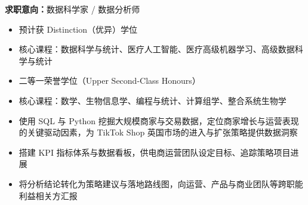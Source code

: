 \documentclass{zh_resume}
\begin{document}
\centerline{\small \textbf{求职意向：}数据科学家 / 数据分析师}



\begin{itemize}
  \item 预计获 Distinction（优异）学位
  \item 核心课程：数据科学与统计、医疗人工智能、医疗高级机器学习、高级数据科学与统计
\end{itemize}


\begin{itemize}
  \item 二等一荣誉学位（Upper Second-Class Honours）
  \item 核心课程：数学、生物信息学、编程与统计、计算组学、整合系统生物学
\end{itemize}



\begin{itemize}
  \item 使用 SQL 与 Python 挖掘大规模商家与交易数据，定位商家增长与运营表现的关键驱动因素，为 TikTok Shop 英国市场的进入与扩张策略提供数据洞察
  \item 搭建 KPI 指标体系与数据看板，供电商运营团队设定目标、追踪策略项目进展
  \item 将分析结论转化为策略建议与落地路线图，向运营、产品与商业团队等跨职能利益相关方汇报
\end{itemize}

\end{document}
